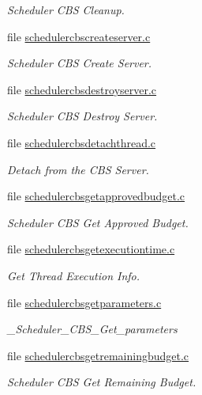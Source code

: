 \begin{DoxyCompactItemize}
\begin{DoxyCompactList}\small\item\em Scheduler C\+BS Cleanup. \end{DoxyCompactList}\item 
file \mbox{\hyperlink{schedulercbscreateserver_8c}{schedulercbscreateserver.\+c}}
\begin{DoxyCompactList}\small\item\em Scheduler C\+BS Create Server. \end{DoxyCompactList}\item 
file \mbox{\hyperlink{schedulercbsdestroyserver_8c}{schedulercbsdestroyserver.\+c}}
\begin{DoxyCompactList}\small\item\em Scheduler C\+BS Destroy Server. \end{DoxyCompactList}\item 
file \mbox{\hyperlink{schedulercbsdetachthread_8c}{schedulercbsdetachthread.\+c}}
\begin{DoxyCompactList}\small\item\em Detach from the C\+BS Server. \end{DoxyCompactList}\item 
file \mbox{\hyperlink{schedulercbsgetapprovedbudget_8c}{schedulercbsgetapprovedbudget.\+c}}
\begin{DoxyCompactList}\small\item\em Scheduler C\+BS Get Approved Budget. \end{DoxyCompactList}\item 
file \mbox{\hyperlink{schedulercbsgetexecutiontime_8c}{schedulercbsgetexecutiontime.\+c}}
\begin{DoxyCompactList}\small\item\em Get Thread Execution Info. \end{DoxyCompactList}\item 
file \mbox{\hyperlink{schedulercbsgetparameters_8c}{schedulercbsgetparameters.\+c}}
\begin{DoxyCompactList}\small\item\em \+\_\+\+Scheduler\+\_\+\+C\+B\+S\+\_\+\+Get\+\_\+parameters \end{DoxyCompactList}\item 
file \mbox{\hyperlink{schedulercbsgetremainingbudget_8c}{schedulercbsgetremainingbudget.\+c}}
\begin{DoxyCompactList}\small\item\em Scheduler C\+BS Get Remaining Budget. \end{DoxyCompactList}\item 

\end{DoxyCompactItemize}
